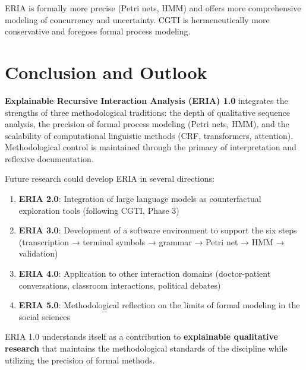 \documentclass[12pt,a4paper]{article}
\begin{document}
ERIA is formally more precise (Petri nets, HMM) and offers more comprehensive modeling of concurrency and uncertainty. CGTI is hermeneutically more conservative and foregoes formal process modeling.

\section{Conclusion and Outlook}

\textbf{Explainable Recursive Interaction Analysis (ERIA) 1.0} integrates the strengths of three methodological traditions: the depth of qualitative sequence analysis, the precision of formal process modeling (Petri nets, HMM), and the scalability of computational linguistic methods (CRF, transformers, attention). Methodological control is maintained through the primacy of interpretation and reflexive documentation.

Future research could develop ERIA in several directions:

\begin{enumerate}
    \item \textbf{ERIA 2.0}: Integration of large language models as counterfactual exploration tools (following CGTI, Phase 3)
    
    \item \textbf{ERIA 3.0}: Development of a software environment to support the six steps (transcription → terminal symbols → grammar → Petri net → HMM → validation)
    
    \item \textbf{ERIA 4.0}: Application to other interaction domains (doctor-patient conversations, classroom interactions, political debates)
    
    \item \textbf{ERIA 5.0}: Methodological reflection on the limits of formal modeling in the social sciences
\end{enumerate}

ERIA 1.0 understands itself as a contribution to \textbf{explainable qualitative research} that maintains the methodological standards of the discipline while utilizing the precision of formal methods.
\end{document}
